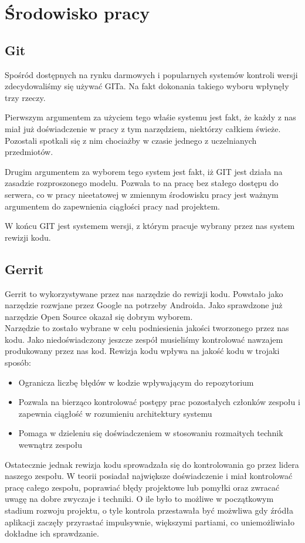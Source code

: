 \documentclass[licencjacka]{pracamgr}
\begin{document}
\section{Środowisko pracy}

\subsection{Git}
Spośród dostępnych na rynku darmowych i popularnych systemów kontroli wersji zdecydowaliśmy się używać GITa. Na fakt dokonania takiego wyboru wpłynęły trzy rzeczy.

Pierwszym argumentem za użyciem tego właśie systemu jest fakt, że każdy z nas miał już doświadczenie w pracy z tym narzędziem, niektórzy całkiem świeże. Pozostali spotkali się z nim chociażby w czasie jednego z uczelnianych przedmiotów.
  
Drugim argumentem za wyborem tego system jest fakt, iż GIT jest działa na zasadzie rozproszonego modelu. Pozwala to na pracę bez stałego dostępu do serwera, co w pracy nieetatowej w zmiennym środowisku pracy jest ważnym argumentem do zapewnienia ciągłości pracy nad projektem.

W końcu GIT jest systemem wersji, z którym pracuje wybrany przez nas system rewizji kodu.

\subsection{Gerrit}
Gerrit to wykorzystywane przez nas narzędzie do rewizji kodu. Powstało jako narzędzie rozwjane przez Google na potrzeby Androida. Jako sprawdzone już narzędzie Open Source okazał się dobrym wyborem.\\

Narzędzie to zostało wybrane w celu podniesienia jakości tworzonego przez nas kodu. Jako niedoświadczony jeszcze zespół musieliśmy kontrolować nawzajem produkowany przez nas kod. Rewizja kodu wpływa na jakość kodu w trojaki sposób:
\begin{itemize}
\item Ogranicza liczbę błędów w kodzie wpływającym do repozytorium
\item Pozwala na bierząco kontrolować postępy prac pozostałych członków zespołu i zapewnia ciągłość w rozumieniu architektury systemu
\item Pomaga w dzieleniu się doświadczeniem w stosowaniu rozmaitych technik wewnątrz zespołu
\end{itemize}

Ostatecznie jednak rewizja kodu sprowadzała się do kontrolowania go przez lidera naszego zespołu. W teorii posiadał największe doświadczenie i miał kontrolować pracę całego zespołu, poprawiać błędy projektowe lub pomyłki oraz zwracać uwagę na dobre zwyczaje i techniki. O ile było to możliwe w początkowym stadium rozwoju projektu, o tyle kontrola przestawała być możwliwa gdy źródła aplikacji zaczęły przyrastać impulsywnie, większymi partiami, co uniemożliwiało dokładne ich sprawdzanie. \\
\end{document}
